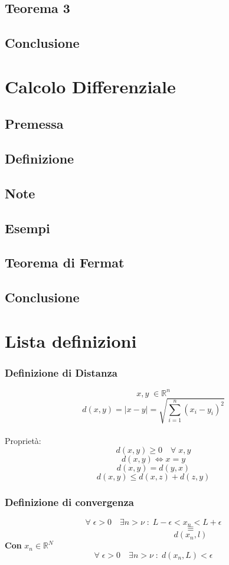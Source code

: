 \documentclass[fontsize = 20px, paper = a4]{article}
\begin{document}
\subsection{Teorema 3}
\subsection{Conclusione}
\section{Calcolo Differenziale}
\subsection{Premessa}
\subsection{Definizione}
\subsection{Note}
\subsection{Esempi}
\subsection{Teorema di Fermat}
\subsection{Conclusione}
\newpage
\section{Lista definizioni}
\subsubsection{Definizione di Distanza}
\hspace*{1cm}
$$x,y \; \in \mathbb{R}^n$$
$$d(x,y) = |x-y| = \sqrt{\sum_{i = 1}^{n}(x_i - y_i)^2} $$ \\ 
Proprietà:
$$d(x,y) \ge 0 \quad \forall \; x,y$$
$$d(x,y) \Leftrightarrow x = y$$
$$d(x,y) = d(y,x) $$
$$d(x,y) \le d(x,z) + d(z,y)$$
\subsubsection{Definizione di convergenza}
\hspace*{1cm}
$$\forall \; \epsilon > 0 \quad \exists n > \nu \; : \; L - \epsilon < x_n < L+\epsilon$$
$$\quad\quad\quad\quad\quad\quad\quad\quad\quad \equiv$$
$$\quad\quad\quad\quad\quad\quad\quad\quad\quad d(x_n,l)$$
\textbf{Con} $x_n \in \mathbb{R}^N$
$$\forall \; \epsilon > 0 \quad \exists n > \nu \; : \; d(x_n,L) < \epsilon$$
 
\end{document}
